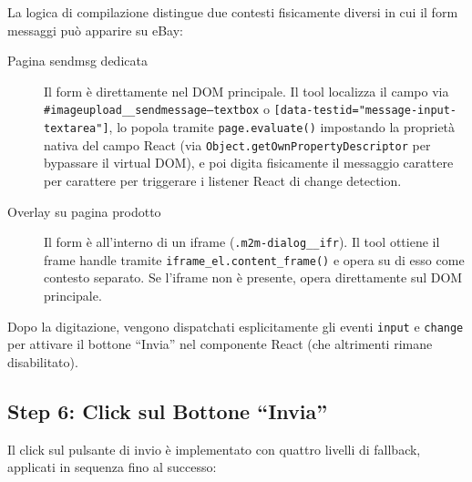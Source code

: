 La logica di compilazione distingue due contesti fisicamente diversi
in cui il form messaggi può apparire su eBay:

\begin{description}
    \item[Pagina sendmsg dedicata] Il form è direttamente nel DOM
        principale. Il tool localizza il campo via
        \texttt{\#imageupload\_\_sendmessage--textbox} o
        \texttt{[data-testid="message-input-textarea"]}, lo popola
        tramite \texttt{page.evaluate()} impostando la proprietà
        nativa del campo React (via \texttt{Object.getOwnPropertyDescriptor}
        per bypassare il virtual DOM), e poi digita fisicamente il
        messaggio carattere per carattere per triggerare i listener
        React di change detection.

    \item[Overlay su pagina prodotto] Il form è all'interno di un
        iframe (\texttt{.m2m-dialog\_\_ifr}). Il tool ottiene il
        frame handle tramite \texttt{iframe\_el.content\_frame()} e
        opera su di esso come contesto separato. Se l'iframe non è
        presente, opera direttamente sul DOM principale.
\end{description}

Dopo la digitazione, vengono dispatchati esplicitamente gli eventi
\texttt{input} e \texttt{change} per attivare il bottone ``Invia''
nel componente React (che altrimenti rimane disabilitato).

\subsection{Step 6: Click sul Bottone ``Invia''}
\label{subsec:pw-contact-send}

Il click sul pulsante di invio è implementato con quattro livelli di
fallback, applicati in sequenza fino al successo:

